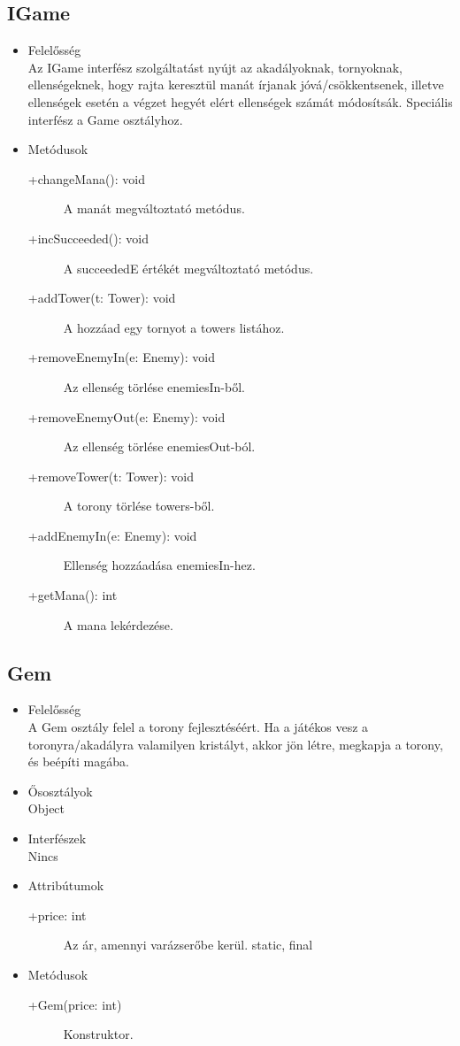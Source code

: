 \subsection{IGame}
\begin{itemize}
\item Felelősség\\
Az IGame interfész szolgáltatást nyújt az akadályoknak, tornyoknak, ellenségeknek, hogy rajta keresztül manát írjanak jóvá/csökkentsenek, illetve ellenségek esetén a végzet hegyét elért ellenségek számát módosítsák. Speciális interfész a Game osztályhoz. 

\item Metódusok
	\begin{description}
		\item[+changeMana(): void] A manát megváltoztató metódus. 
\item[+incSucceeded(): void] A succeededE értékét megváltoztató metódus.
\item[+addTower(t: Tower): void] A hozzáad egy tornyot a towers listához.
\item[+removeEnemyIn(e: Enemy): void] Az ellenség törlése enemiesIn-ből. 
\item[+removeEnemyOut(e: Enemy): void] Az ellenség törlése enemiesOut-ból. 
\item[+removeTower(t: Tower): void] A torony törlése towers-ből. 
\item[+addEnemyIn(e: Enemy): void] Ellenség hozzáadása enemiesIn-hez. 
\item[+getMana(): int] A mana lekérdezése. 


		
	\end{description}
\end{itemize}

\subsection{Gem}
\begin{itemize}
\item Felelősség\\
A Gem osztály felel a torony fejlesztéséért. Ha a játékos vesz a toronyra/akadályra valamilyen kristályt, akkor jön létre, megkapja a torony, és beépíti magába. 
\item Ősosztályok\\
Object
\item Interfészek\\
Nincs
\item Attribútumok
	\begin{description}
		\item[+price: int] Az ár, amennyi varázserőbe kerül. static, final
	\end{description}
\item Metódusok
	\begin{description}
		
		\item[+Gem(price: int)] Konstruktor. 
		
		
	\end{description}
\end{itemize}

